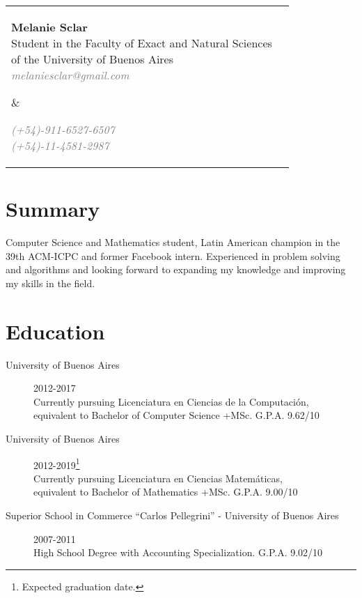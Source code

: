\documentclass [a4paper, 11pt]{article}
\begin{document}
\noindent \begin{tabularx}{\textwidth}{X r}
  \hspace{-15pt}\parbox[t]{15cm}{
  \hspace{-2pt}\textbf{\huge{Melanie Sclar}} \\
  Student in the Faculty of Exact and Natural Sciences \\
  of the University of Buenos Aires \\
  \emph{ \textcolor{gray}{melaniesclar@gmail.com} }
  } &

\parbox[t]{3.8cm}{ \emph{\textcolor{gray}{
  (+54)-911-6527-6507 \\
  (+54)-11-4581-2987 }}
  
}
\end{tabularx}

\sectionfont{\sectionrule{0pt}{0pt}{-.2cm}{1pt}}
\section* {Summary}
Computer Science and Mathematics student, Latin American champion in the 39th ACM-ICPC and former Facebook intern. Experienced in problem solving and algorithms and looking forward to expanding my knowledge and improving my skills in the field.
\section* {Education}

\begin{description}
  \item[University of Buenos Aires]{\hfill 2012-2017 \\
	Currently pursuing Licenciatura en Ciencias de la Computaci\'on, \\
	equivalent to Bachelor of Computer Science +MSc. G.P.A. 9.62/10}

  \item[University of Buenos Aires]{\hfill 2012-2019\footnote{Expected graduation date.} \\
	Currently pursuing Licenciatura en Ciencias Matem\'aticas, \\
	equivalent to Bachelor of Mathematics +MSc. G.P.A. 9.00/10}
	
  \item[Superior School in Commerce ``Carlos Pellegrini'' - University of Buenos Aires] {\hfill 2007-2011 \\
	High School Degree with Accounting Specialization. G.P.A. 9.02/10}
\end{description}
\end{document}

